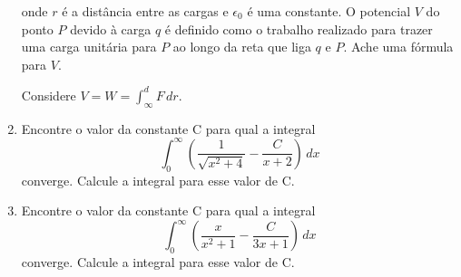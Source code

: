 \documentclass[11pt,a4paper]{article}
\newcommand{\integral}{\displaystyle\int}
\begin{document}
\begin{enumerate}
		onde $r$ é a distância entre as cargas e $\epsilon_0$ é uma constante. O potencial $V$ do ponto $P$ 		devido à carga $q$ é definido como o trabalho realizado para trazer uma carga unitária para $P$ ao 				longo da reta que liga $q$ e $P$. Ache uma fórmula para $V$.

		Considere $V = W = \integral_{\infty}^d F \, dr$.
		
		\item Encontre o valor da constante C para qual a integral
		$$\integral_0^{\infty} \left(\frac{1}{\sqrt{x^2 + 4}} - \frac{C}{x + 2}\right) \, dx$$
		converge. Calcule a integral para esse valor de C.
		
		\item Encontre o valor da constante C para qual a integral
		$$\integral_0^{\infty} \left(\frac{x}{x^2 + 1} - \frac{C}{3x + 1}\right) \, dx$$
		converge. Calcule a integral para esse valor de C.
		
		
		
								
	\end{enumerate}
	
\end{document}
